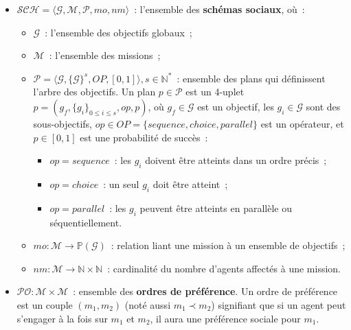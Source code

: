 \begin{itemize}
  \item $\mathcal{SCH} = \langle\mathcal{G}, \mathcal{M}, \mathcal{P}, mo, nm \rangle$~: l'ensemble des \textbf{schémas sociaux}, où~:
        \begin{itemize}
          \item $\mathcal{G}$~: l'ensemble des objectifs globaux~;
          \item $\mathcal{M}$~: l'ensemble des missions~;
          \item $\mathcal{P} = \langle \mathcal{G}, \{\mathcal{G}\}^s, OP, [0,1] \rangle, s \in \mathbb{N}^*$~: ensemble des plans qui définissent l'arbre des objectifs.
                Un plan $p \in \mathcal{P}$ est un 4-uplet $p = (g_f, \{g_i\}_{0 \leq i \leq s}, op, p)$, où $g_f \in \mathcal{G}$ est un objectif, les $g_i \in \mathcal{G}$ sont des sous-objectifs, $op \in OP = \{sequence, choice, parallel\}$ est un opérateur, et $p \in [0,1]$ est une probabilité de succès~:
                \begin{itemize}
                  \item $op = sequence$~: les $g_i$ doivent être atteints dans un ordre précis~;
                  \item $op = choice$~: un seul $g_i$ doit être atteint~;
                  \item $op = parallel$~: les $g_i$ peuvent être atteints en parallèle ou séquentiellement.
                \end{itemize}
          \item $mo: \mathcal{M} \rightarrow \mathbb{P}(\mathcal{G})$~: relation liant une mission à un ensemble de objectifs~;
          \item $nm: \mathcal{M} \rightarrow \mathbb{N} \times \mathbb{N}$~: cardinalité du nombre d'agents affectés à une mission.
        \end{itemize}
  \item $\mathcal{PO}: \mathcal{M} \times \mathcal{M}$~: ensemble des \textbf{ordres de préférence}. Un ordre de préférence est un couple $(m_1, m_2)$ (noté aussi $m_1 \prec m_2$) signifiant que si un agent peut s'engager à la fois sur $m_1$ et $m_2$, il aura une préférence sociale pour $m_1$.
\end{itemize}

\medskip

